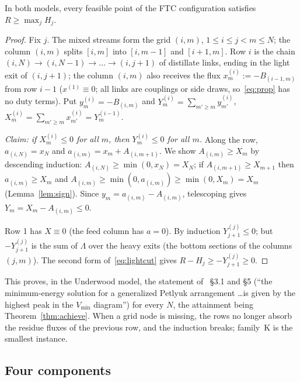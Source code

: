 \documentclass[11pt,a4paper]{report}
\newcommand{\Lam}{\Lambda}
\begin{document}
\begin{theorem}\label{thm:ftc}
In both models, every feasible point of the FTC configuration satisfies $R\ge\max_jH_j$.
\end{theorem}
\begin{proof}
Fix $j$. The mixed streams form the grid $(i,m)$, $1\le i\le j<m\le N$; the column $(i,m)$ splits $[i,m]$ into
$[i,m-1]$ and $[i+1,m]$. Row $i$ is the chain $(i,N)\to(i,N-1)\to\dots\to(i,j+1)$ of distillate links, ending in the
light exit of $(i,j+1)$; the column $(i,m)$ also receives the flux $x^{(i)}_m:=-B_{(i-1,m)}$ from row $i-1$ ($x^{(1)}\equiv0$;
all links are couplings or side draws, so~\eqref{eq:prop} has no duty terms). Put $y^{(i)}_m=-B_{(i,m)}$ and
$Y^{(i)}_m=\sum_{m'\ge m}y^{(i)}_{m'}$, $X^{(i)}_m=\sum_{m'\ge m}x^{(i)}_{m'}=Y^{(i-1)}_m$.

\emph{Claim: if $X^{(i)}_m\le0$ for all $m$, then $Y^{(i)}_m\le0$ for all $m$.} Along the row,
$a_{(i,N)}=x_N$ and $a_{(i,m)}=x_m+A_{(i,m+1)}$. We show $A_{(i,m)}\ge X_m$ by descending induction:
$A_{(i,N)}\ge\min(0,x_N)=X_N$; if $A_{(i,m+1)}\ge X_{m+1}$ then $a_{(i,m)}\ge X_m$ and
$A_{(i,m)}\ge\min(0,a_{(i,m)})\ge\min(0,X_m)=X_m$ (Lemma~\ref{lem:sign}). Since $y_m=a_{(i,m)}-A_{(i,m)}$, telescoping gives
$Y_m=X_m-A_{(i,m)}\le0$.

Row 1 has $X\equiv0$ (the feed column has $a=0$). By induction $Y^{(j)}_{j+1}\le0$; but $-Y^{(j)}_{j+1}$ is the sum of
$\Lam$ over the heavy exits (the bottom sections of the columns $(j,m)$). The second form of~\eqref{eq:lightcut}
gives $R-H_j\ge-Y^{(j)}_{j+1}\ge0$.
\end{proof}

This proves, in the Underwood model, the statement of~\autocite{HS3} \S3.1 and \S5 (``the minimum-energy solution for
a generalized Petlyuk arrangement \dots is given by the highest peak in the $V_{\min}$ diagram'') for every $N$, the
attainment being Theorem~\ref{thm:achieve}. When a grid node is missing, the rows no longer absorb the residue fluxes
of the previous row, and the induction breaks; family~K is the smallest instance.

\subsection{Four components}
\end{document}
